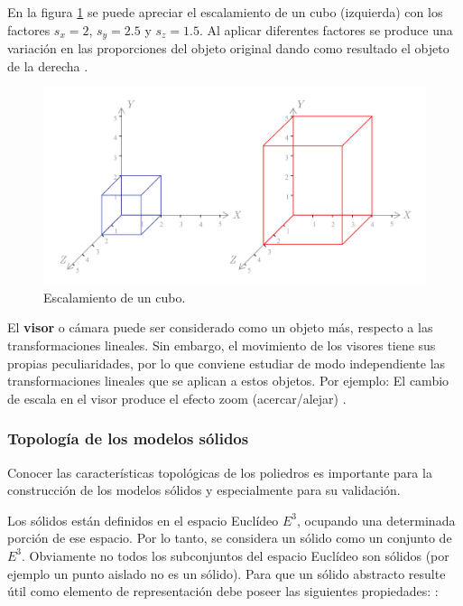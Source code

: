 En la figura \ref{fig:escala} se puede apreciar el escalamiento de un cubo (izquierda) con los factores $s_x=2$, $s_y=2.5$ y $s_z=1.5$. Al aplicar diferentes factores se produce una variación en las proporciones del objeto original dando como resultado el objeto de la derecha \citep{Matias2007}.

\begin{center}
\begin{figure}[ht]
\includegraphics[width=12cm]{Img/GEO/geo-escala0.jpg}
\centering
\caption{\footnotesize{Escalamiento de un cubo.}}
\label{fig:escala}
\end{figure}
\end{center}


El \textbf{visor} o cámara puede ser considerado como un objeto más, respecto a las transformaciones lineales. Sin embargo, el movimiento de los visores tiene sus propias peculiaridades, por lo que conviene estudiar de modo independiente las transformaciones lineales que se aplican a estos objetos. Por ejemplo: El cambio de escala en el visor produce el efecto \gls{zoom} (acercar/alejar) \citep{Ramos2011}.

\subsubsection{Topología de los modelos sólidos}
\newline
Conocer las características topológicas de los poliedros es importante para la construcción de los modelos sólidos y especialmente para su validación. 

Los sólidos están definidos en el espacio Euclídeo $E^3$, ocupando una determinada porción de ese espacio. Por lo tanto, se considera un sólido como un conjunto de $E^3$. Obviamente no todos los subconjuntos del espacio Euclídeo son sólidos (por ejemplo un punto aislado no es un sólido). Para que un sólido abstracto resulte útil como elemento de representación debe poseer las siguientes propiedades: \citep{Torres2014}:

